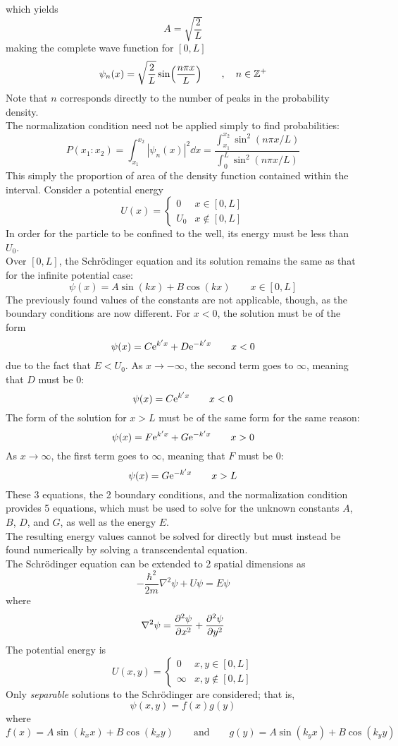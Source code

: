 \documentclass{subfiles}
\begin{document}
				which yields
				\[A = \sqrt{\frac{2}{L}}\]
				making the complete wave function for \([0, L]\)
				\[
					\psi_n(x) = \sqrt{\frac{2}{L}}\sin(\frac{n\pi x}{L}) \qquad
						, \quad n \in \mathbb{Z}^+
				\]
				Note that \(n\) corresponds directly to the number of peaks in the probability density. \\
			The normalization condition need not be applied simply to find probabilities:
				\[
					P(x_1:x_2) = \int_{x_1}^{x_2}|\psi_n(x)|^2 \dd{x}
						= \frac{\int_{x_1}^{x_2}\sin^2(n\pi x/L)}{\int_0^L\sin^2(n\pi x/L)}
				\]
				This simply the proportion of area of the density function contained within the interval.
			Consider a potential energy
				\[
					U(x) = \begin{cases}
							0 & x \in [0, L] \\
							U_0 & x \notin [0, L]
						\end{cases}
				\]
				In order for the particle to be confined to the well, its energy must be less than \(U_0\). \\
				Over \([0, L]\), the Schr\"odinger equation and its solution remains the same as that for the infinite potential case:
				\[
					\psi(x) = A\sin(kx) + B\cos(kx) \qquad
						x \in [0, L]
				\]
				The previously found values of the constants are not applicable, though, as the boundary conditions are now different. For \(x < 0\), the solution must be of the form
				\[
					\psi(x) = C\text{e}^{k'x} + D\text{e}^{-k'x} \qquad
						x < 0
				\]
				due to the fact that \(E < U_0\). As \(x \to -\infty\), the second term goes to \(\infty\), meaning that \(D\) must be 0:
				\[
					\psi(x) = C\text{e}^{k'x} \qquad
						x < 0
				\]
				The form of the solution for \(x > L\) must be of the same form for the same reason:
				\[
					\psi(x) = F\text{e}^{k'x} + G\text{e}^{-k'x} \qquad
						x > 0
				\]
				As \(x \to \infty\), the first term goes to \(\infty\), meaning that \(F\) must be 0:
				\[
					\psi(x) = G\text{e}^{-k'x} \qquad
						x > L
				\]
				These 3 equations, the 2 boundary conditions, and the normalization condition provides 5 equations, which must be used to solve for the unknown constants \(A\), \(B\), \(D\), and \(G\), as well as the energy \(E\). \\
				The resulting energy values cannot be solved for directly but must instead be found numerically by solving a transcendental equation. \\
			The Schr\"odinger equation can be extended to 2 spatial dimensions as
				\[
					-\frac{\hbar^2}{2m}\nabla^2\psi + U\psi = E\psi
						\tag{2D time-independent Schr\"odinger equation}
				\]
				where
				\[
					\nabla^2\psi = \pdv[2]{\psi}{x} + \pdv[2]{\psi}{y}
				\]
				The potential energy is
				\[
					U(x, y) = \begin{cases}
 							0 & x, y \in [0, L] \\
 							\infty & x, y \notin [0, L]
 						\end{cases}
				\]
				Only \textit{separable} solutions to the Schr\"odinger are considered; that is,
				\[\psi(x, y) = f(x)g(y)\]
				where
				\[
					f(x) = A\sin(k_xx) + B\cos(k_xy) \qquad \text{and} \qquad
						g(y) = A\sin(k_yx) + B\cos(k_yy)
				\]
\end{document}
